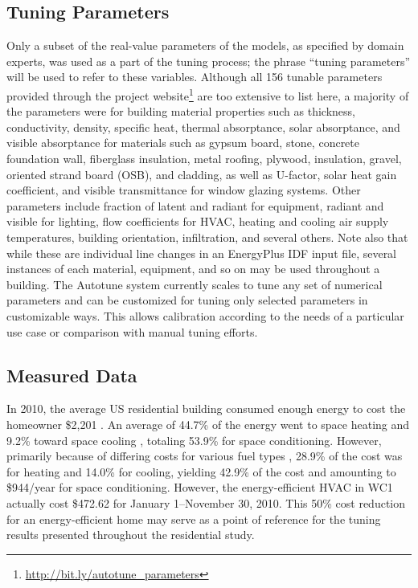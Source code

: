 \documentclass[preprint, review, 12pt]{elsarticle}
\begin{document}
\subsection{Tuning Parameters}
Only a subset of the real-value parameters of the models, as specified by domain experts, was used as a part of the tuning process; the phrase ``tuning parameters'' will be used to refer to these variables. Although all 156 tunable parameters provided through the project website\footnote{\url{http://bit.ly/autotune_parameters}} are too extensive to list here, a majority of the parameters were for building material properties such as thickness, conductivity, density, specific heat, thermal absorptance, solar absorptance, and visible absorptance for materials such as gypsum board, stone, concrete foundation wall, fiberglass insulation, metal roofing, plywood, insulation, gravel, oriented strand board (OSB), and cladding, as well as U-factor, solar heat gain coefficient, and visible transmittance for window glazing systems. Other parameters include fraction of latent and radiant %
for equipment, radiant and visible for lighting, flow coefficients for HVAC, heating and cooling air supply temperatures, building orientation, infiltration, and several others. Note also that while these are individual line changes in an EnergyPlus IDF input file, several instances of each material, equipment, and so on may be used throughout a building. The Autotune system currently scales to tune any set of numerical parameters and can be customized for tuning only selected parameters in customizable ways. This allows calibration according to the needs of a particular use case or comparison with manual tuning efforts.

\subsection{Measured Data}
In 2010, the average US residential building consumed enough energy to cost the homeowner \$2,201 \cite{cit:doe2012a}. An average of 44.7\% of the energy went to space heating and 9.2\% toward space cooling \cite{cit:doe2012b}, totaling 53.9\% for space conditioning. However, primarily because of differing costs for various fuel types \cite{cit:doe2012c}, 28.9\% of the cost was for heating and 14.0\% for cooling, yielding 42.9\% of the cost and amounting to \$944/year for space conditioning. However, the energy-efficient HVAC in WC1 actually cost \$472.62 for January 1--November 30, 2010. This 50\% cost reduction for an energy-efficient home may serve as a point of reference for the tuning results presented throughout the residential study.
\end{document}
